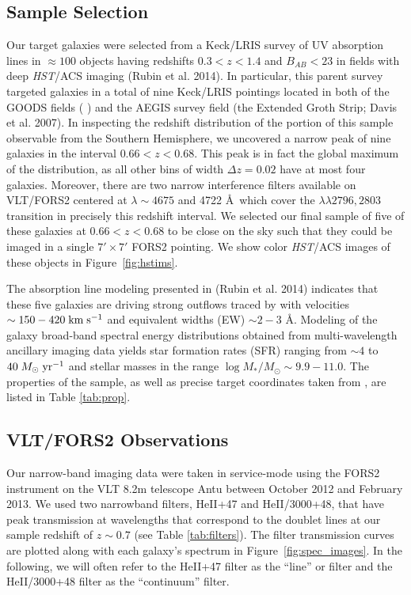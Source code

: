 \documentclass[twocolumn]{aastex61}
\def \mkms {{\rm \; km\;s^{-1}}}
\def \msunperyr {{\; M_{\odot}\rm \;yr^{-1}}}
\begin{document}
\subsection{Sample Selection}
Our target galaxies were selected from a Keck/LRIS survey of UV absorption lines in $\approx 100$ objects having redshifts $0.3< z < 1.4$ and $B_{AB}< 23$ in fields with deep \emph{HST}/ACS imaging (Rubin et al. 2014)\nocite{Rubin_2014}.  In particular, this parent survey targeted galaxies in a total of nine Keck/LRIS pointings located in both of the GOODS fields (\citeauthor{Giavalisco2004} \citeyear{Giavalisco2004}) and the AEGIS survey field (the Extended Groth Strip; Davis et al. 2007)\nocite{Davis2007}.  In inspecting the redshift distribution of the portion of this sample observable from the Southern Hemisphere, we uncovered a narrow peak of nine galaxies in the interval $0.66 < z < 0.68$.  This peak is in fact the global maximum of the distribution, as all other bins of width $\Delta z = 0.02$ have at most four galaxies.  Moreover, there are two narrow interference filters available on VLT/FORS2 centered at $\lambda \sim 4675$ and 4722 \AA\ which cover the  $\lambda \lambda 2796, 2803$ transition in precisely this redshift interval.  We selected our final sample of five of these galaxies at $0.66 < z < 0.68$ to be close on the sky such that they could be imaged in a single $7' \times 7' $ FORS2 pointing.  
We show color {\it HST}/ACS images of these objects in Figure~\ref{fig:hstims}.

The absorption line modeling presented in (Rubin et al. 2014)\nocite{Rubin_2014} indicates that these five galaxies are driving strong outflows traced by   with velocities $\sim150-420\mkms$ and equivalent widths (EW) $\sim 2-3$ \AA.  Modeling of the galaxy broad-band spectral energy distributions obtained from multi-wavelength ancillary imaging data yields star formation rates (SFR) ranging from $\sim4$ to $40\msunperyr$ and stellar masses in the range $\log M_*/M_{\odot}\sim 9.9-11.0$. The properties of the sample, as well as precise target coordinates taken from \cite{Rubin_2014}, are listed in Table \ref{tab:prop}. 


\subsection{VLT/FORS2 Observations}
Our narrow-band imaging data were taken in service-mode using the FORS2 instrument on the VLT 8.2m telescope Antu between October 2012 and February 2013. 
We used two narrowband filters, HeII+47 and HeII/3000+48, that have peak transmission at wavelengths that correspond to the  doublet lines at our sample redshift of $z\sim0.7$ (see Table \ref{tab:filters}). The filter transmission curves are plotted along with each galaxy's spectrum in Figure~\ref{fig:spec_images}.
In the following, we will often refer to the HeII+47 filter as the ``line'' or  filter and the HeII/3000+48 filter as the ``continuum'' filter.
\end{document}
